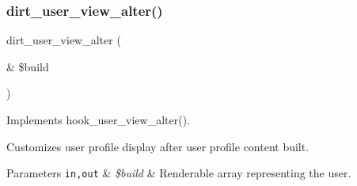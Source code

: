 \subsubsection{\texorpdfstring{dirt\+\_\+user\+\_\+view\+\_\+alter()}{dirt\_user\_view\_alter()}}
{\footnotesize\ttfamily dirt\+\_\+user\+\_\+view\+\_\+alter (\begin{DoxyParamCaption}\item[{\&}]{\$build }\end{DoxyParamCaption})}

Implements hook\+\_\+user\+\_\+view\+\_\+alter().

Customizes user profile display after user profile content built.


\begin{DoxyParams}[1]{Parameters}
\mbox{\tt in,out}  & {\em \$build} & Renderable array representing the user. \\
\hline
\end{DoxyParams}
